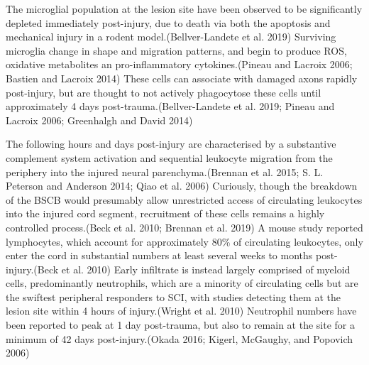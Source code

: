 \documentclass[9pt,lineno]{elife}
\begin{document}
The microglial population at the lesion site have been observed to be significantly depleted immediately post-injury, due to death via both the apoptosis and mechanical injury in a rodent model.(Bellver-Landete et al. 2019)
Surviving microglia change in shape and migration patterns, and begin to produce ROS, oxidative metabolites an pro-inflammatory cytokines.(Pineau and Lacroix 2006; Bastien and Lacroix 2014)
These cells can associate with damaged axons rapidly post-injury, but are thought to not actively phagocytose these cells until approximately 4 days post-trauma.(Bellver-Landete et al. 2019; Pineau and Lacroix 2006; Greenhalgh and David 2014)

The following hours and days post-injury are characterised by a substantive complement system activation and sequential leukocyte migration from the periphery into the injured neural parenchyma.(Brennan et al. 2015; S. L. Peterson and Anderson 2014; Qiao et al. 2006)
Curiously, though the breakdown of the BSCB would presumably allow unrestricted access of circulating leukocytes into the injured cord segment, recruitment of these cells remains a highly controlled process.(Beck et al. 2010; Brennan et al. 2019)
A mouse study reported lymphocytes, which account for approximately 80\% of circulating leukocytes, only enter the cord in substantial numbers at least several weeks to months post-injury.(Beck et al. 2010)
Early infiltrate is instead largely comprised of myeloid cells, predominantly neutrophils, which are a minority of circulating cells but are the swiftest peripheral responders to SCI, with studies detecting them at the lesion site within 4 hours of injury.(Wright et al. 2010)
Neutrophil numbers have been reported to peak at 1 day post-trauma, but also to remain at the site for a minimum of 42 days post-injury.(Okada 2016; Kigerl, McGaughy, and Popovich 2006)
\end{document}
